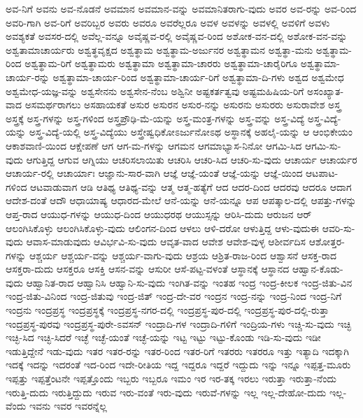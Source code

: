 {ಅವ-ನಿಗೆ
ಅವನು
ಅವ-ನೊಡನೆ
ಅವಮಾನ
ಅವಮಾನ-ವನ್ನು
ಅವಮಾನಿತರಾಗು-ವುದು
ಅವರ
ಅವ-ರನ್ನು
ಅವ-ರಿಂದ
ಅವರಿ-ಗಾಗಿ
ಅವ-ರಿಗೆ
ಅವರಿಬ್ಬರ
ಅವರು
ಅವರೂ
ಅವರೆಲ್ಲರೂ
ಅವಳ
ಅವಳನ್ನು
ಅವಳಲ್ಲಿ
ಅವಳಿಗೆ
ಅವಳು
ಅವಶ್ಯಕತೆ
ಅವಸರ-ದಲ್ಲಿ
ಅವೆಲ್ಲ-ವನ್ನೂ
ಅವೈಷ್ಣವ-ರಲ್ಲಿ
ಅವೈಷ್ಣವ-ರಿಂದ
ಅಶೋಕ-ವನ-ದಲ್ಲಿ
ಅಶೋಕ-ವನ-ವನ್ನು
ಅಶ್ವತಾಮಾಚಾರ್ಯರು
ಅಶ್ವತ್ಥವೃಕ್ಷದ
ಅಶ್ವತ್ಥಾಮ
ಅಶ್ವತ್ಥಾಮ-ಅರ್ಜುನರ
ಅಶ್ವತ್ಥಾಮನ
ಅಶ್ವತ್ಥಾ-ಮನು
ಅಶ್ವತ್ಥಾಮ-ರಿಂದ
ಅಶ್ವತ್ಥಾಮ-ರಿಗೆ
ಅಶ್ವತ್ಥಾಮರು
ಅಶ್ವತ್ಥಾಮಾ
ಅಶ್ವತ್ಥಾಮಾ-ಚಾರರು
ಅಶ್ವತ್ಥಾಮಾ-ಚಾರೈರಿಗೂ
ಅಶ್ವತ್ಥಾಮಾ-ಚಾರ್ಯ-ರನ್ನು
ಅಶ್ವತ್ಥಾಮಾ-ಚಾರ್ಯ-ರಿಂದ
ಅಶ್ವತ್ಥಾಮಾ-ಚಾರ್ಯ-ರಿಗೆ
ಅಶ್ವತ್ಥಾಮಾ-ದಿ-ಗಳು
ಅಶ್ವದ
ಅಶ್ವಮೇಧ
ಅಶ್ವಮೇಧ-ಯಜ್ಞ-ವನ್ನು
ಅಶ್ವಸೇನನು
ಅಶ್ವಸೇನ-ನೆಂಬ
ಅಶ್ವಿನೀ
ಅಷ್ಟಕರ್ತತ್ವವು
ಅಷ್ಟಮಹಿಷಿಯ-ರಿಗೆ
ಅಸಂಖ್ಯಾತ-ವಾದ
ಅಸಮರ್ಥರಾಗಲು
ಅಸಹಾಯಕತೆ
ಅಸುರ
ಅಸುರನ
ಅಸುರ-ನನ್ನು
ಅಸುರನು
ಅಸುರರು
ಅಸುರಾವೇಶ
ಅಸ್ತ್ರ
ಅಸ್ತ್ರಕ್ಕೆ
ಅಸ್ತ್ರ-ಗಳನ್ನು
ಅಸ್ತ್ರ-ಗಳಿಂದ
ಅಸ್ತ್ರಪ್ರೌಢಿ-ಮೆ-ಯನ್ನು
ಅಸ್ತ್ರ-ಮಂತ್ರ-ಗಳನ್ನು
ಅಸ್ತ್ರ-ವನ್ನು
ಅಸ್ತ್ರ-ವಿದ್ಯೆ
ಅಸ್ತ್ರ-ವಿದ್ಯೆ-ಯನ್ನು
ಅಸ್ತ್ರ-ವಿದ್ಯೆ-ಯಲ್ಲಿ
ಅಸ್ತ್ರ-ವಿದ್ಯೆಯು
ಅಸ್ತ್ರೇಷ್ವಧಿಕೋಽರ್ಜುನೋಽಥ
ಅಸ್ಥಾನಕ್ಕೆ
ಅಹಲೈ-ಯನ್ನು
ಆ
ಆಂಭಿಕೇಯಂ
ಆಕಾಶವಾಣಿ-ಯಿಂದ
ಆಕ್ಷೇಪಣೆ
ಆಗ
ಆಗ-ಮ-ಗಳನ್ನು
ಆಗಮನ
ಆಗಮಾಭ್ಯಾಸ-ನಿನೋ
ಆಗಮಿ-ಸಿದ
ಆಗಮಿ-ಸು-ವುದು
ಆಗುತ್ತಿದ್ದ
ಆಗುವ
ಆಗ್ನಿಯು
ಆಚರಿಸಲಾಯಿತು
ಆಚರಿಸಿ
ಆಚರಿ-ಸಿದ
ಆಚರಿ-ಸು-ವುದು
ಆಚಾರ್ಯ
ಆಚಾರ್ಯರ
ಆಚಾರ್ಯ-ರಲ್ಲಿ
ಆಚಾರ್ಯಾಃ
ಆಜ್ಞಾನು-ಸಾರ-ವಾಗಿ
ಆಜ್ಞೆ
ಆಜ್ಞೆ-ಯಂತೆ
ಆಜ್ಞೆ-ಯನ್ನು
ಆಜ್ಞೆ-ಯಿಂದ
ಆಟಪಾಟ-ಗಳಿಂದ
ಆಟವಾಡುವಾಗ
ಆಡಿ
ಆತಿಥ್ಯ
ಆತಿಥ್ಯ-ವನ್ನು
ಆತ್ಮ
ಆತ್ಮ-ಹತ್ಯೆಗೆ
ಆದ
ಆದರ-ದಿಂದ
ಆದರವು
ಆದರೂ
ಆದಾಗ
ಆದೇಶ-ದಂತೆ
ಆದೌ
ಆಧಾಯಾಷ್ಯ
ಆಧಾರದ-ಮೇಲೆ
ಆನೆ-ಯನ್ನು
ಆನೆ-ಯನ್ನೂ
ಆಪ
ಆಪತ್ಕಾಲ-ದಲ್ಲಿ
ಆಪತ್ತು-ಗಳನ್ನು
ಆಪ್ತ-ರಾದ
ಆಯುಧ-ಗಳನ್ನು
ಆಯುಧ-ದಿಂದ
ಆಯುಧರಥ
ಆಯುಸ್ಸನ್ನು
ಆರಿಸಿ-ದುದು
ಆರುಜನ
ಆರ್
ಆಲಂಗಿಸಿಕೊಳ್ಳು
ಆಲಂಗಿಸಿಕೊಳ್ಳು-ವುದು
ಆಲಿಂಗನ-ದಿಂದ
ಆಳಲು
ಆಳಿ-ದರೋ
ಆಳುತ್ತಿದ್ದ
ಆಳು-ವುದುಈ
ಆವರಿ-ಸು-ವುದು
ಆವಾಸ-ಮಾಡುವುದು
ಆವಿರ್ಭವಿ-ಸು-ವುದು
ಆವೃತ-ವಾದ
ಆವೇಶ
ಆವೇಶ-ವುಳ್ಳ
ಆಶೀರ್ವದಿಸ
ಆಶೋತ್ತರ-ಗಳನ್ನು
ಆಶ್ಚರ್ಯ
ಆಶ್ಚರ್ಯ-ವನ್ನು
ಆಶ್ಚರ್ಯ-ವಾಗು-ವುದು
ಆಶ್ರಯ
ಆಶ್ರಿತ-ರಾಜ-ರಿಂದ
ಆಶ್ವಾಸನೆ
ಆಸಕ್ತ-ರಾದ
ಆಸಕ್ತರಾ-ದುದು
ಆಸಕ್ತರೂ
ಆಸಕ್ತಿ
ಆಸನ-ವನ್ನು
ಆಸುರೀ
ಆಸೆ-ಪಟ್ಟ-ವಳಂತೆ
ಆಸ್ಥಾನಕ್ಕೆ
ಆಸ್ಥಾನದ
ಆಹ್ವಾನ-ಕೊಡು-ವುದು
ಆಹ್ವಾನಿತ-ರಾದ
ಆಹ್ವಾನಿಸಿ
ಆಹ್ವಾನಿ-ಸು-ವುದು
ಇಂಗಿತ-ವನ್ನು
ಇಂತಹ
ಇಂದ್ರ
ಇಂದ್ರ-ಕೀಲಕ
ಇಂದ್ರ-ಜಿತು-ವಿನ
ಇಂದ್ರ-ಜಿತು-ವಿನಿಂದ
ಇಂದ್ರ-ಜಿತುವು
ಇಂದ್ರ-ಜಿತ್
ಇಂದ್ರ-ದೇ-ವರ
ಇಂದ್ರನ
ಇಂದ್ರ-ನನ್ನು
ಇಂದ್ರ-ನಿಂದ
ಇಂದ್ರ-ನಿಗೆ
ಇಂದ್ರನು
ಇಂದ್ರಪ್ರಸ್ಥ
ಇಂದ್ರಪ್ರಸ್ಥಕ್ಕೆ
ಇಂದ್ರಪ್ರಸ್ಥ-ನಗರ-ದಲ್ಲಿ
ಇಂದ್ರಪ್ರಸ್ಥ-ಪುರ-ದಲ್ಲಿ
ಇಂದ್ರಪ್ರಸ್ಥ-ಪುರ-ದಲ್ಲಿ-ರುತ್ತಾ
ಇಂದ್ರಪ್ರಸ್ಥ-ಪುರವು
ಇಂದ್ರಪ್ರಸ್ಥ-ಪುರೇ-ಽವಸನ್
ಇಂದ್ರಾದಿ-ಗಳ
ಇಂದ್ರಾದಿ-ಗಳಿಗೆ
ಇಂದ್ರಿಯ-ಗಳು
ಇಚ್ಚಿ-ಸು-ವುದು
ಇಚ್ಛಿ
ಇಚ್ಛಿ-ಸಿದ
ಇಚ್ಛಿ-ಸಿದರೆ
ಇಚ್ಛೆ
ಇಚ್ಛೆ-ಯಂತೆ
ಇಚ್ಛೆ-ಯನ್ನು
ಇಟ್ಟ
ಇಟ್ಟು
ಇಟ್ಟು-ಕೊಂಡು
ಇಡಿ-ಸು-ವುದು
ಇಡೀ
ಇಡುತ್ತಿದ್ದೇನೆ
ಇಡು-ವುದು
ಇತರ
ಇತರ-ರನ್ನು
ಇತರ-ರಿಂದ
ಇತರ-ರಿಗೆ
ಇತರರು
ಇತರರೂ
ಇತ್ತು
ಇತ್ಯಾದಿ
ಇದಕ್ಕಾಗಿ
ಇದಕ್ಕೆ
ಇದನ್ನು
ಇದರಂತೆ
ಇದ-ರಿಂದ
ಇದೇ-ರೀತಿಯ
ಇದ್ದ
ಇದ್ದರೂ
ಇದ್ದರೆ
ಇದ್ದುದು
ಇನ್ನು
ಇನ್ನೂ
ಇಪ್ಪತ್ತ-ಮೂರು
ಇಪ್ಪತ್ತು
ಇಪ್ಪತ್ತೆಂಟನೇ
ಇಪ್ಪತ್ತೊಂದು
ಇಬ್ಬರು
ಇಬ್ಬರೂ
ಇಮಂ
ಇರ
ಇರ-ತಕ್ಕ
ಇರಲು
ಇರುತ್ತಾ
ಇರುತ್ತಾ-ನೆಂದು
ಇರುತ್ತಿ-ದುದು
ಇರುತ್ತಿದ್ದುದು
ಇರುವ
ಇರು-ವಂತೆ
ಇರು-ವುದು
ಇರುವೆ-ಗಳನ್ನು
ಇಲ್ಲ
ಇಲ್ಲ-ದೇಹೋ-ದುದು
ಇಲ್ಲ-ವೆಂದು
ಇವನು
ಇವರ
ಇವರನ್ನೆಲ್ಲ
}
